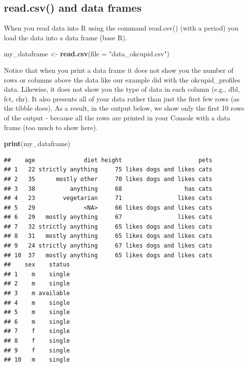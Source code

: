 \documentclass[
]{krantz}
\makeatletter
\newenvironment{Shaded}{\begin{snugshade}}{\end{snugshade}}
\newcommand{\DataTypeTok}[1]{\textcolor[rgb]{0.27,0.27,0.27}{#1}}
\newcommand{\KeywordTok}[1]{\textcolor[rgb]{0.27,0.27,0.27}{\textbf{#1}}}
\newcommand{\NormalTok}[1]{#1}
\newcommand{\StringTok}[1]{\textcolor[rgb]{0.5,0.5,0.5}{#1}}
\newenvironment{kframe}{%
\medskip{}
\setlength{\fboxsep}{.8em}
 \def\at@end@of@kframe{}%
 \ifinner\ifhmode%
  \def\at@end@of@kframe{\end{minipage}}%
  \begin{minipage}{\columnwidth}%
 \fi\fi%
 \def\FrameCommand##1{\hskip\@totalleftmargin \hskip-\fboxsep
 \colorbox{shadecolor}{##1}\hskip-\fboxsep
     \hskip-\linewidth \hskip-\@totalleftmargin \hskip\columnwidth}%
 \MakeFramed {\advance\hsize-\width
   \@totalleftmargin\z@ \linewidth\hsize
   \@setminipage}}%
 {\par\unskip\endMakeFramed%
 \at@end@of@kframe}
\renewenvironment{Shaded}{\begin{kframe}}{\end{kframe}}
\makeatother
\begin{document}
\hypertarget{read.csv-and-data-frames}{%
\subsection{read.csv() and data frames}\label{read.csv-and-data-frames}}

When you read data into R using the command read.csv() (with a period) you load the data into a data frame (base R).

\begin{Shaded}
\begin{Highlighting}[]
\NormalTok{my_dataframe <-}\StringTok{ }\KeywordTok{read.csv}\NormalTok{(}\DataTypeTok{file =} \StringTok{"data_okcupid.csv"}\NormalTok{)}
\end{Highlighting}
\end{Shaded}

Notice that when you print a data frame it does not show you the number of rows or columns above the data like our example did with the okcupid\_profiles data. Likewise, it does not show you the type of data in each column (e.g., dbl, fct, chr). It also presents all of your data rather than just the first few rows (as the tibble does). As a result, in the output below, we show only the first 10 rows of the output - because all the rows are printed in your Console with a data frame (too much to show here).

\begin{Shaded}
\begin{Highlighting}[]
\KeywordTok{print}\NormalTok{(my_dataframe)}
\end{Highlighting}
\end{Shaded}

\begin{verbatim}
##    age              diet height                      pets
## 1   22 strictly anything     75 likes dogs and likes cats
## 2   35      mostly other     70 likes dogs and likes cats
## 3   38          anything     68                  has cats
## 4   23        vegetarian     71                likes cats
## 5   29              <NA>     66 likes dogs and likes cats
## 6   29   mostly anything     67                likes cats
## 7   32 strictly anything     65 likes dogs and likes cats
## 8   31   mostly anything     65 likes dogs and likes cats
## 9   24 strictly anything     67 likes dogs and likes cats
## 10  37   mostly anything     65 likes dogs and likes cats
##    sex    status
## 1    m    single
## 2    m    single
## 3    m available
## 4    m    single
## 5    m    single
## 6    m    single
## 7    f    single
## 8    f    single
## 9    f    single
## 10   m    single
\end{verbatim}
\end{document}
